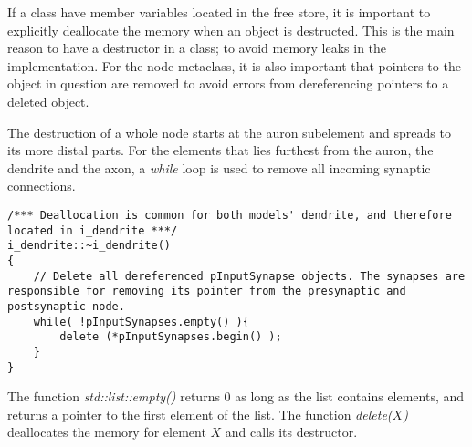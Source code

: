 			If a class have member variables located in the free store, it is important to explicitly deallocate the memory when an object is destructed. %
			This is the main reason to have a destructor in a class; to avoid memory leaks in the implementation.
			For the node metaclass, it is also important that pointers to the object in question are removed to avoid errors from dereferencing pointers to a deleted object.

			The destruction of a whole node starts at the auron subelement and spreads to its more distal parts.
			For the elements that lies furthest from the auron, the dendrite and the axon, a \emph{while} loop is used to remove all incoming synaptic connections.
\begin{lstlisting}
/*** Deallocation is common for both models' dendrite, and therefore located in i_dendrite ***/
i_dendrite::~i_dendrite()
{
	// Delete all dereferenced pInputSynapse objects. The synapses are responsible for removing its pointer from the presynaptic and postsynaptic node.
	while( !pInputSynapses.empty() ){
	 	delete (*pInputSynapses.begin() );
	}
}
\end{lstlisting}
			The function \emph{std::list::empty()} returns 0 as long as the list contains elements, and  returns a pointer to the first element of the list.
			The function \emph{delete($X$)} deallocates the memory for element $X$ and calls its destructor. %

